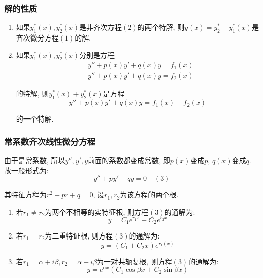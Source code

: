 \subsubsection{解的性质}
\begin{enumerate}
    \item 如果$ y_{1}^{*}(x), y_{2}^{*}(x) $是非齐次方程$ (2) $的两个特解, 则$ y(x)=y_{2}^{*}-y_{1}^{*}(x) $是齐次微分方程$ (1) $的解.
    \item 如果$ y_{1}^{*}(x),y_{2}^{*}(x) $分别是方程
          \begin{equation*}
              \begin{aligned}
                   & y''+p(x)y'+q(x)y=f_{1}(x) \\
                   & y''+p(x)y'+q(x)y=f_{2}(x)
              \end{aligned}
          \end{equation*}\par
          的特解, 则$ y_{1}^{*}(x)+y_{2}^{*}(x) $是方程
          \begin{equation*}
              y''+p(x)y'+q(x)y=f_{1}(x)+f_{2}(x)
          \end{equation*}\par
          的一个特解.
\end{enumerate}
\subsubsection{常系数齐次线性微分方程}
由于是常系数, 所以$ y'',y',y $前面的系数都变成常数, 即$ p(x) $变成$ p $, $ q(x) $变成$ q $. 故一般形式为:
\begin{equation*}
    y''+py'+qy=0 \quad (3)
\end{equation*}\par
其特征方程为$ r^{2}+pr+q=0 $, 设$ r_{1}, r_{2} $为该方程的两个根.
\begin{enumerate}
    \item 若$ r_{1}\neq r_{2} $为两个不相等的实特征根, 则方程$ (3) $的通解为:
          \begin{equation*}
              y=C_{1}e^{r_{1}x}+C_{2}e^{r_{2}x}
          \end{equation*}
    \item 若$ r_{1}=r_{2} $为二重特证根, 则方程$ (3) $的通解为:
          \begin{equation*}
              y=(C_{1}+C_{2}x)e^{r_{1}(x)}
          \end{equation*}
    \item 若$ r_{1}=\alpha+i\beta, r_{2}=\alpha-i\beta $为一对共轭复根, 则方程$ (3) $的通解为:
          \begin{equation*}
              y=e^{\alpha x}(C_{1}\cos \beta x+C_{2}\sin \beta x)
          \end{equation*}
\end{enumerate}
